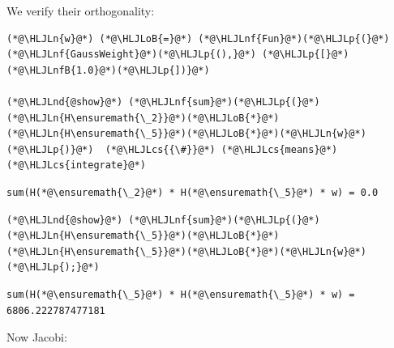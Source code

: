 \documentclass[12pt,a4paper]{article}
\newcommand{\HLJLn}[1]{#1}
\newcommand{\HLJLnd}[1]{\textcolor[RGB]{214,102,97}{#1}}
\newcommand{\HLJLnf}[1]{\textcolor[RGB]{66,102,213}{#1}}
\newcommand{\HLJLnfB}[1]{\textcolor[RGB]{59,151,46}{#1}}
\newcommand{\HLJLoB}[1]{\textcolor[RGB]{102,102,102}{\textbf{#1}}}
\newcommand{\HLJLp}[1]{#1}
\newcommand{\HLJLcs}[1]{\textcolor[RGB]{153,153,119}{\textit{#1}}}
\begin{document}
We verify their orthogonality:


\begin{lstlisting}
(*@\HLJLn{w}@*) (*@\HLJLoB{=}@*) (*@\HLJLnf{Fun}@*)(*@\HLJLp{(}@*)(*@\HLJLnf{GaussWeight}@*)(*@\HLJLp{(),}@*) (*@\HLJLp{[}@*)(*@\HLJLnfB{1.0}@*)(*@\HLJLp{])}@*)

(*@\HLJLnd{@show}@*) (*@\HLJLnf{sum}@*)(*@\HLJLp{(}@*)(*@\HLJLn{H\ensuremath{\_2}}@*)(*@\HLJLoB{*}@*)(*@\HLJLn{H\ensuremath{\_5}}@*)(*@\HLJLoB{*}@*)(*@\HLJLn{w}@*)(*@\HLJLp{)}@*)  (*@\HLJLcs{{\#}}@*) (*@\HLJLcs{means}@*) (*@\HLJLcs{integrate}@*)
\end{lstlisting}

\begin{lstlisting}
sum(H(*@\ensuremath{\_2}@*) * H(*@\ensuremath{\_5}@*) * w) = 0.0
\end{lstlisting}


\begin{lstlisting}
(*@\HLJLnd{@show}@*) (*@\HLJLnf{sum}@*)(*@\HLJLp{(}@*)(*@\HLJLn{H\ensuremath{\_5}}@*)(*@\HLJLoB{*}@*)(*@\HLJLn{H\ensuremath{\_5}}@*)(*@\HLJLoB{*}@*)(*@\HLJLn{w}@*)(*@\HLJLp{);}@*)
\end{lstlisting}

\begin{lstlisting}
sum(H(*@\ensuremath{\_5}@*) * H(*@\ensuremath{\_5}@*) * w) = 6806.222787477181
\end{lstlisting}


Now Jacobi:
\end{document}
